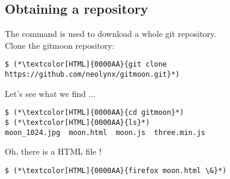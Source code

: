 

\subsection{Obtaining a repository}
\begin{frame}[fragile]
  \subslidetitle
  The command  is used to download a whole git repository.
  \\
  \vspace{1em}
  Clone the gitmoon repository:
  \begin{lstlisting}
$ (*\textcolor[HTML]{0000AA}{git clone https://github.com/neolynx/gitmoon.git}*)
  \end{lstlisting}


  Let's see what we find ...
  \begin{lstlisting}
$ (*\textcolor[HTML]{0000AA}{cd gitmoon}*)
$ (*\textcolor[HTML]{0000AA}{ls}*)
moon_1024.jpg  moon.html  moon.js  three.min.js
  \end{lstlisting}

  Oh, there is a HTML file !
  \begin{lstlisting}
$ (*\textcolor[HTML]{0000AA}{firefox moon.html \&}*)
  \end{lstlisting}

\end{frame}

